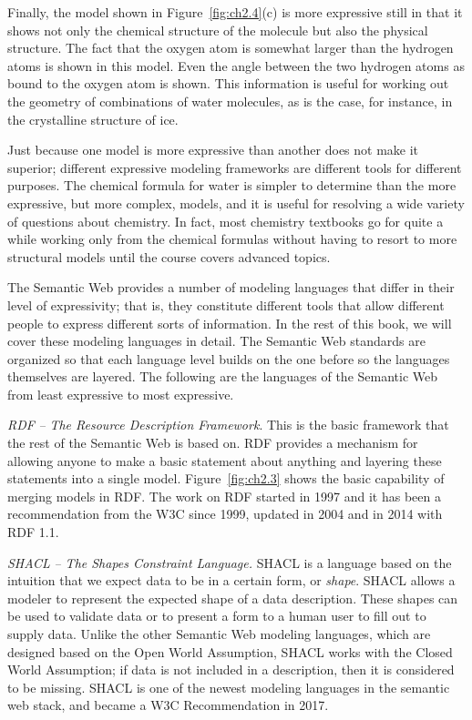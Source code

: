 Finally, the model shown in Figure~\ref{fig:ch2.4}(c) is more expressive still in
that it shows not only the chemical structure of the molecule but also
the physical structure. The fact that the oxygen atom is somewhat larger
than the hydrogen atoms is shown in this model. Even the angle between
the two hydrogen atoms as bound to the oxygen atom is shown. This
information is useful for working out the geometry of combinations of
water molecules, as is the case, for instance, in the crystalline
structure of ice.

Just because one model is more expressive than another does not make it
superior; different expressive modeling frameworks are different tools
for different purposes. The chemical formula for water is simpler to
determine than the more expressive, but more complex, models, and it is
useful for resolving a wide variety of questions about chemistry. In
fact, most chemistry textbooks go for quite a while working only from
the chemical formulas without having to resort to more structural models
until the course covers advanced topics.

The Semantic Web provides a number of modeling languages that differ in
their level of expressivity; that is, they constitute different tools
that allow different people to express different sorts of information.
In the rest of this book, we will cover these modeling languages in
detail. The Semantic Web standards are organized so that each language
level builds on the one before so the languages themselves are layered.
The following are the languages of the Semantic Web from least
expressive to most expressive.

\emph{RDF} \emph{--} \emph{The Resource Description Framework}. This is
the basic framework that the rest of the Semantic Web is based on. RDF
provides a mechanism for allowing anyone to make a basic statement about
anything and layering these statements into a single model. Figure~\ref{fig:ch2.3}
shows the basic capability of merging models in RDF. The work on RDF
started in 1997 and it has been a recommendation from the W3C since
1999, updated in 2004 and in 2014 with RDF 1.1.

\emph{SHACL} \emph{-- The Shapes Constraint Language.} SHACL is a language
based on the intuition that we expect data to be in a certain form, or \emph{shape}.
SHACL allows a modeler to represent the expected shape of a data description. These shapes can be
used to validate data or to present a form to a human user to fill out to supply data.
Unlike the other Semantic Web modeling languages, which are designed based on the Open 
World Assumption, SHACL works with the Closed World Assumption; if data is not 
included in  a description, then it is considered to be missing. 
SHACL is one of the newest modeling languages in the semantic web stack, and became a
W3C Recommendation in 2017. 

